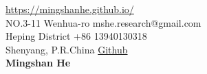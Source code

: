 \documentclass{cv} %
\begin{document}
 \hfill \href{https://mingshanhe.github.io/}{https://mingshanhe.github.io/}\\
NO.3-11 Wenhua-ro \hfill mshe.research@gmail.com\\
Heping District \hfill +86 13940130318\\
Shenyang, P.R.China \hfill \href{https://github.com/MingshanHe}{Github}\\

\hfil{\namesize\bf Mingshan He}\hfil













%


\end{document}
